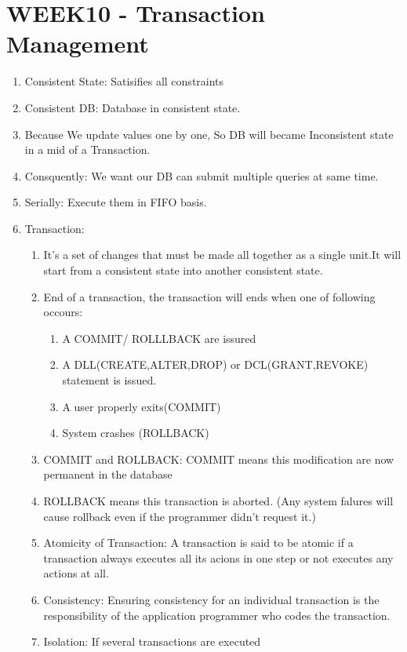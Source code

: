 \pagebreak
\section{WEEK10 - Transaction Management}
\begin{enumerate}
    \item Consistent State: Satisifies all constraints
    \item Consistent DB: Database in consistent state.
    \item Because We update values one by one, So DB will became Inconsistent state in a mid of a Transaction.
    \item Consquently: We want our DB can submit multiple queries at same time.
    \item Serially: Execute them in FIFO basis.
    \item Transaction:\begin{enumerate}
        \item It's a set of changes that must be made all together as a single unit.It will start from a consistent state into another consistent state.
        \item End of a transaction, the transaction will ends when one of following occours:\begin{enumerate}
            \item A COMMIT/ ROLLLBACK are issured
            \item A DLL(CREATE,ALTER,DROP) or DCL(GRANT,REVOKE) statement is issued.
            \item A user properly exits(COMMIT)
            \item System crashes (ROLLBACK)
        \end{enumerate}
        \item COMMIT and ROLLBACK: COMMIT means this modification are now permanent in the database
        \item ROLLBACK means this transaction is aborted. (Any system falures will cause rollback even if the programmer didn't request it.)
        \item Atomicity of Transaction: A transaction is said to be atomic if a transaction always executes all its acions in one step or not executes any actions at all.
        \item Consistency: Ensuring consistency for an individual transaction
is the responsibility of the application
programmer who codes the transaction.
        \item Isolation: If several transactions are executed

\end{enumerate}
\end{enumerate}
